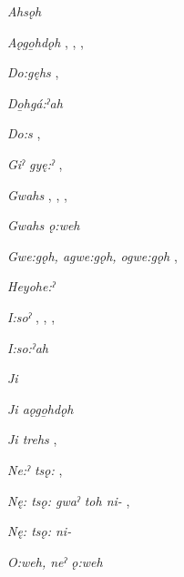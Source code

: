 \begin{CayugaRelated}
 \item{}  \textit{Ahsǫh} 

\item{} \textit{Aǫgo̱hdǫh} , , , 

\item{} \textit{Do:gęhs} , 

\item{} \textit{Do̱hgá:ˀah} 

\item{} \textit{Do:s} , 

\item{} \textit{Giˀ gyę:ˀ} , 

\item{} \textit{Gwahs} , , , 

\item{} \textit{Gwahs ǫ:weh} 

\item{} \textit{Gwe:gǫh, agwe:gǫh, ogwe:gǫh} , 

\item{} \textit{Heyohe:ˀ} 

\item{} \textit{I:soˀ} , , , 

\item{} \textit{I:so:ˀah} 

\item{} \textit{Ji} 

\item{} \textit{Ji aǫgo̱hdǫh} 

\item{} \textit{Ji trehs} , 

\item{} \textit{Ne:ˀ tsǫ:} , 


\item{} \textit{Nę: tsǫ: gwaˀ toh ni-} , 

\item{} \textit{Nę: tsǫ: ni-} 

\item{} \textit{O:weh, neˀ ǫ:weh} 


\end{CayugaRelated}

